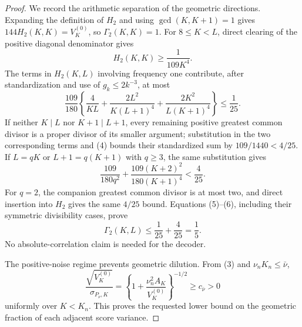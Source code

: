 \documentclass{article}
\begin{document}
\begin{proof}
We record the arithmetic separation of the geometric directions.  Expanding the definition of \(H_2\) and using \(\gcd(K,K+1)=1\) gives \(144H_2(K,K)=V_K^{(0)}\), so \(\Gamma_2(K,K)=1\).  For \(8\leq K<L\), direct clearing of the positive diagonal denominator gives
\[
 H_2(K,K)\geq\frac1{109K^4}.                                                            \tag{4}
\]
The terms in \(H_2(K,L)\) involving frequency one contribute, after standardization and use of \(g_k\leq2k^{-3}\), at most
\[
 \frac{109}{180}\left\{\frac4{KL}
 +\frac{2L^2}{K(L+1)^4}+\frac{2K^2}{L(K+1)^4}\right\}\leq\frac1{25}.                   \tag{5}
\]
If neither \(K\mid L\) nor \(K+1\mid L+1\), every remaining positive greatest common divisor is a proper divisor of its smaller argument; substitution in the two corresponding terms and (4) bounds their standardized sum by \(109/1440<4/25\).  If \(L=qK\) or \(L+1=q(K+1)\) with \(q\geq3\), the same substitution gives
\[
 \frac{109}{180q^2}+\frac{109(K+2)^2}{180(K+1)^4}<\frac4{25}.                            \tag{6}
\]
For \(q=2\), the companion greatest common divisor is at most two, and direct insertion into \(H_2\) gives the same \(4/25\) bound.  Equations (5)--(6), including their symmetric divisibility cases, prove
\[
 \Gamma_2(K,L)\leq\frac1{25}+\frac4{25}=\frac15.                                       \tag{7}
\]
No absolute-correlation claim is needed for the decoder.

The positive-noise regime prevents geometric dilution.  From (3) and \(\nu_nK_n\leq\bar\nu\),
\[
 \frac{\sqrt{V_K^{(0)}}}{\sigma_{P_\nu,K}}
 =\left\{1+\frac{\nu_n^2A_K}{V_K^{(0)}}\right\}^{-1/2}
 \geq c_{\bar\nu}>0                                                                    \tag{8}
\]
uniformly over \(K<K_n\).  This proves the requested lower bound on the geometric fraction of each adjacent score variance.


\end{proof}
\end{document}
